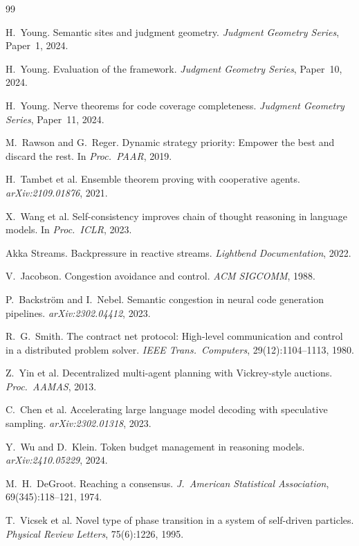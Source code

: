 \documentclass[11pt]{article}
\begin{document}
\begin{thebibliography}{99}

H.~Young.
\newblock Semantic sites and judgment geometry.
\newblock \textit{Judgment Geometry Series}, Paper~1, 2024.

H.~Young.
\newblock Evaluation of the \JuGeo{} framework.
\newblock \textit{Judgment Geometry Series}, Paper~10, 2024.

H.~Young.
\newblock Nerve theorems for code coverage completeness.
\newblock \textit{Judgment Geometry Series}, Paper~11, 2024.

M.~Rawson and G.~Reger.
\newblock Dynamic strategy priority: Empower the best and discard the rest.
\newblock In \textit{Proc.\ PAAR}, 2019.

H.~Tambet et al.
\newblock Ensemble theorem proving with cooperative agents.
\newblock \textit{arXiv:2109.01876}, 2021.

X.~Wang et al.
\newblock Self-consistency improves chain of thought reasoning in language models.
\newblock In \textit{Proc.\ ICLR}, 2023.

Akka Streams.
\newblock Backpressure in reactive streams.
\newblock \textit{Lightbend Documentation}, 2022.

V.~Jacobson.
\newblock Congestion avoidance and control.
\newblock \textit{ACM SIGCOMM}, 1988.

P.~Backstr\"om and I.~Nebel.
\newblock Semantic congestion in neural code generation pipelines.
\newblock \textit{arXiv:2302.04412}, 2023.

R.~G.~Smith.
\newblock The contract net protocol: High-level communication and control in a
  distributed problem solver.
\newblock \textit{IEEE Trans.\ Computers}, 29(12):1104--1113, 1980.

Z.~Yin et al.
\newblock Decentralized multi-agent planning with Vickrey-style auctions.
\newblock \textit{Proc.\ AAMAS}, 2013.

C.~Chen et al.
\newblock Accelerating large language model decoding with speculative sampling.
\newblock \textit{arXiv:2302.01318}, 2023.

Y.~Wu and D.~Klein.
\newblock Token budget management in reasoning models.
\newblock \textit{arXiv:2410.05229}, 2024.

M.~H.~DeGroot.
\newblock Reaching a consensus.
\newblock \textit{J.~American Statistical Association}, 69(345):118--121, 1974.

T.~Vicsek et al.
\newblock Novel type of phase transition in a system of self-driven particles.
\newblock \textit{Physical Review Letters}, 75(6):1226, 1995.

\end{thebibliography}
\end{document}
